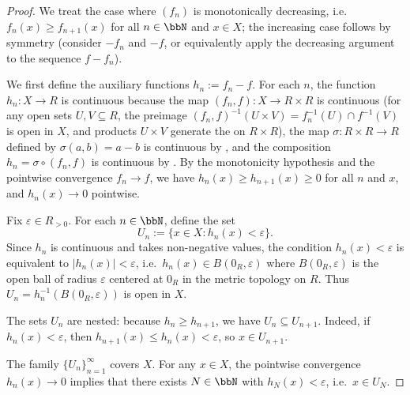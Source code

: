\begin{proof}
    We treat the case where $(f_n)$ is monotonically decreasing, i.e.\ $f_n(x) \geq f_{n+1}(x)$ for all $n \in \bbN$ and $x \in X$; the increasing case follows by symmetry (consider $-f_n$ and $-f$, or equivalently apply the decreasing argument to the sequence $f - f_n$).

    We first define the auxiliary functions $h_n := f_n - f$. For each $n$, the function $h_n : X \to R$ is continuous because the map $(f_n, f) : X \to R \times R$ is continuous (for any open sets $U, V \subseteq R$, the preimage $(f_n, f)^{-1}(U \times V) = f_n^{-1}(U) \cap f^{-1}(V)$ is open in $X$, and products $U \times V$ generate the  on $R \times R$), the map $\sigma : R \times R \to R$ defined by $\sigma(a,b) = a - b$ is continuous by , and the composition $h_n = \sigma \circ (f_n, f)$ is continuous by . By the monotonicity hypothesis and the pointwise convergence $f_n \to f$, we have $h_n(x) \geq h_{n+1}(x) \geq 0$ for all $n$ and $x$, and $h_n(x) \to 0$ pointwise.


    Fix $\varepsilon \in R_{>0}$. For each $n \in \bbN$, define the set
    $$
    U_n := \{x \in X : h_n(x) < \varepsilon\}.
    $$
    Since $h_n$ is continuous and takes non-negative values, the condition $h_n(x) < \varepsilon$ is equivalent to $|h_n(x)| < \varepsilon$, i.e.\ $h_n(x) \in B(0_R, \varepsilon)$ where $B(0_R, \varepsilon)$ is the open ball of radius $\varepsilon$ centered at $0_R$ in the metric topology on $R$. Thus $U_n = h_n^{-1}(B(0_R, \varepsilon))$ is open in $X$.

    The sets $U_n$ are nested: because $h_n \geq h_{n+1}$, we have $U_n \subseteq U_{n+1}$. Indeed, if $h_n(x) < \varepsilon$, then $h_{n+1}(x) \leq h_n(x) < \varepsilon$, so $x \in U_{n+1}$.

    The family $\{U_n\}_{n=1}^\infty$ covers $X$. For any $x \in X$, the pointwise convergence $h_n(x) \to 0$ implies that there exists $N \in \bbN$ with $h_N(x) < \varepsilon$, i.e.\ $x \in U_N$.


\end{proof}
